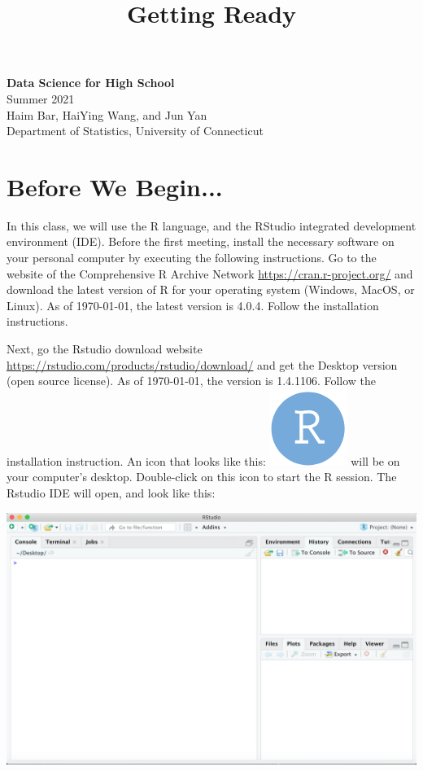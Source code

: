 \documentclass[11pt]{article}
\theoremstyle{definition}
\begin{document}
\setcounter{section}{0}
\title{Getting Ready}

\thispagestyle{empty}

\begin{center}
{\LARGE \bf Data Science for High School}\\
{\large Summer 2021\\
Haim Bar, HaiYing Wang, and Jun Yan\\Department of Statistics, University of Connecticut}
\end{center}
\section{Before We Begin...}
In this class, we will use the R language, and the RStudio integrated development environment (IDE). Before the first meeting, install the necessary software on your personal computer by executing the following instructions.
Go to the website of the Comprehensive R Archive Network \url{https://cran.r-project.org/} and download the latest version of R for your operating system (Windows, MacOS, or Linux). As of \today, the latest version is 4.0.4. Follow the installation instructions.

Next, go the Rstudio download website \url{https://rstudio.com/products/rstudio/download/} and get the Desktop version (open source license). As of \today, the version is 1.4.1106. Follow the installation instruction. An icon that looks like this: \includegraphics[scale=0.3]{RstudioLogo.png} will be on your computer's desktop. Double-click on this icon to start the R session. The Rstudio IDE will open, and look like this:

\begin{center}
\includegraphics[scale=0.4]{RstudioMain.png}
\end{center}
\end{document}
